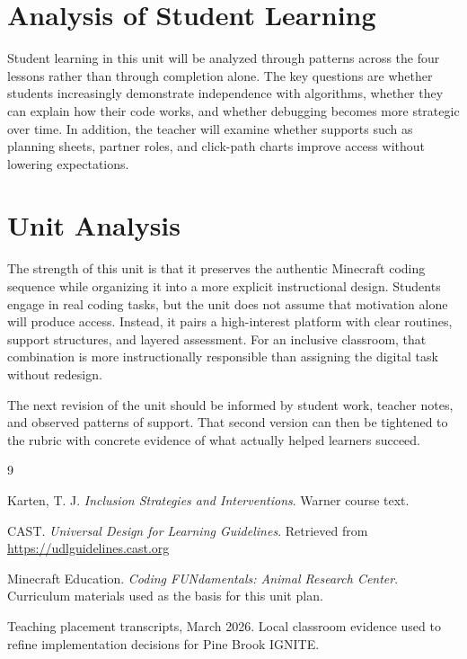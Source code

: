 \documentclass[12pt]{article}
\begin{document}
\section{Analysis of Student Learning}

Student learning in this unit will be analyzed through patterns across the four lessons rather than through completion alone. The key questions are whether students increasingly demonstrate independence with algorithms, whether they can explain how their code works, and whether debugging becomes more strategic over time. In addition, the teacher will examine whether supports such as planning sheets, partner roles, and click-path charts improve access without lowering expectations.

\section{Unit Analysis}

The strength of this unit is that it preserves the authentic Minecraft coding sequence while organizing it into a more explicit instructional design. Students engage in real coding tasks, but the unit does not assume that motivation alone will produce access. Instead, it pairs a high-interest platform with clear routines, support structures, and layered assessment. For an inclusive classroom, that combination is more instructionally responsible than assigning the digital task without redesign.

The next revision of the unit should be informed by student work, teacher notes, and observed patterns of support. That second version can then be tightened to the rubric with concrete evidence of what actually helped learners succeed.

\newpage
\begin{thebibliography}{9}

Karten, T. J. \emph{Inclusion Strategies and Interventions}. Warner course text.

CAST. \emph{Universal Design for Learning Guidelines}. Retrieved from \url{https://udlguidelines.cast.org}

Minecraft Education. \emph{Coding FUNdamentals: Animal Research Center}. Curriculum materials used as the basis for this unit plan.

Teaching placement transcripts, March 2026. Local classroom evidence used to refine implementation decisions for Pine Brook IGNITE.

\end{thebibliography}
\end{document}
